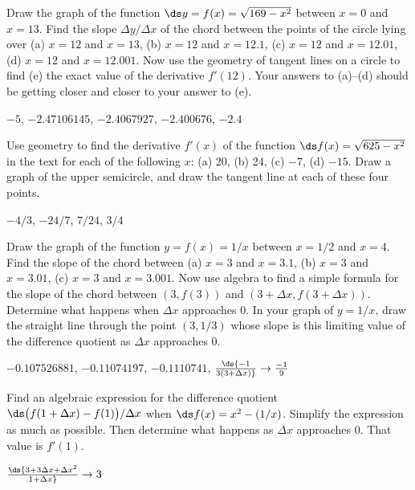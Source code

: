 \begin{enumialphparenastyle}

\begin{ex}
Draw the graph of the function $\ds y=f(x)=\sqrt{169-x^2}$ between $x=0$
and $x=13$.  Find the slope $\Delta y/\Delta x$ of the chord between the
points of the circle lying over (a) $x=12$ and $x=13$, (b) $x=12$ and
$x=12.1$,  (c) $x=12$ and $x=12.01$, (d) $x=12$ and $x=12.001$.  Now use
the geometry of tangent lines on a circle to find (e) the exact value of the
derivative $f'(12)$.  Your answers to (a)--(d) should be getting closer and
closer to your answer to (e).
\begin{sol}
$-5$, $-2.47106145$, $-2.4067927$, $-2.400676$, $-2.4$
\end{sol}
\end{ex}

\begin{ex}
Use geometry to find the derivative $f'(x)$ of the function
$\ds f(x)=\sqrt{625-x^2}$ in the text for each of the following $x$: (a) 20,
(b) 24, (c) $-7$, (d) $-15$.  Draw a graph of the upper semicircle, and
draw the tangent line at each of these four points.
\begin{sol}
$-4/3$, $-24/7$, $7/24$, $3/4$
\end{sol}
\end{ex}

\begin{ex}
Draw the graph of the function $y=f(x)=1/x$ between $x=1/2$ and $x=4$.
Find the slope of the chord between (a) $x=3$ and $x=3.1$, (b) $x=3$ and
$x=3.01$, (c) $x=3$ and $x=3.001$.  Now use algebra to find a simple
formula for the slope of the chord between $(3,f(3))$ and $(3+\Delta
x,f(3+\Delta x))$.  Determine what happens when $\Delta x$ approaches 0.
In your graph of $y=1/x$, draw the straight line through the point
$(3,1/3)$ whose slope is this limiting value of the difference quotient as
$\Delta x$ approaches 0.
\begin{sol}
$-0.107526881$, $-0.11074197$, $-0.1110741$, 
$\ds{-1\over3(3+\Delta x)}\rightarrow {-1\over9}$
\end{sol}
\end{ex}

\begin{ex}
Find an algebraic expression for the difference quotient $\ds \bigl(f(1+\Delta
x)-f(1)\bigr)/\Delta x$ when $\ds f(x)=x^2-(1/x)$.  Simplify the expression as
much as possible.  Then determine what happens as $\Delta x$ approaches 0.
That value is $f'(1)$.
\begin{sol}
$\ds{3+3\Delta x+\Delta x^2\over1+\Delta x}\rightarrow3$ 
\end{sol}
\end{ex}


\end{enumialphparenastyle}
